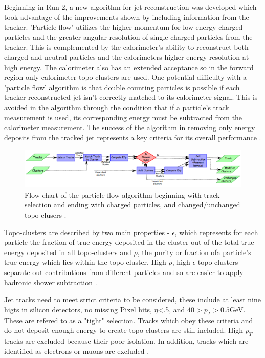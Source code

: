 Beginning in Run-2, a new algorithm for jet reconstruction was developed which took advantage of the improvements shown by including information from the tracker. 'Particle flow' utilizes the higher momentum for low-energy charged particles and the greater angular resolution of single charged particles from the tracker. This is complemented by the calorimeter's ability to reconstruct both charged and neutral particles and the calorimeters higher energy resolution at high energy. The calorimeter also has an extended acceptance so in the forward region only calorimeter topo-clusters are used. One potential difficulty with a 'particle flow' algorithm is that double counting particles is possible if each tracker reconstructed jet isn't correctly matched to its calorimeter signal. This is avoided in the algorithm through the condition that if a particle's track measurement is used, its corresponding energy must be subtracted from the calorimeter measurement. The success of the algorithm in removing only energy deposits from the tracked jet represents a key criteria for its overall performance \cite{ParticleFlow}.

\begin{figure}[!h]
        \centering
    \includegraphics[width=.85\textwidth]{Pictures/ParticleFlow.png}
    \caption{Flow chart of the particle flow algorithm beginning with track selection and ending with charged particles, and changed/unchanged topo-clusers \cite{ParticleFlow}.}
    \label{fig:ParticleFlow}
\end{figure}

Topo-clusters are described by two main properties - $\epsilon$, which represents for each particle the fraction of true energy deposited in the cluster out of the total true energy deposited in all topo-clusters and $\rho$, the purity or fraction ofa particle's true energy which lies within the topo-cluster. High $\rho$, high $\epsilon$ topo-clusters separate out contributions from different particles and so are easier to apply hadronic shower subtraction \cite{ParticleFlow}.

Jet tracks need to meet strict criteria to be considered, these include at least nine higts in silicon detectors, no missing Pixel hits, $\eta$<.5, and $40>p_T>0.5$GeV. These are refered to as a "tight" selection. Tracks which obey these criteria and do not deposit enough energy to create topo-clusters are still included. High $p_T$ tracks are excluded because their poor isolation. In addition, tracks which are identified as electrons or muons are excluded \cite{ParticleFlow}. 

